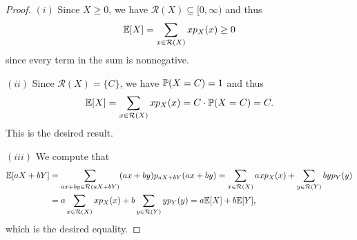 \begin{proof}
  $(i)$ Since $X \ge 0$, we have $\mathcal{R}(X) \subseteq [0, \infty)$
  and thus
  \[
    \mathbb{E}[X] = \sum_{x \in \mathcal{R}(X)} x p_X(x) \ge 0
  \]
  since every term in the sum is nonnegative.

  $(ii)$ Since $\mathcal{R}(X) = \{C\}$, we have
  $\mathbb{P}(X = C) = 1$ and thus
  \[
    \mathbb{E}[X] = \sum_{x \in \mathcal{R}(X)} x p_X(x)
    = C \cdot \mathbb{P}(X = C) = C.
  \]
  This is the desired result.

  $(iii)$ We compute that
  \begin{align*}
    \mathbb{E}[aX + bY]
    &= \sum_{ax + by \in \mathcal{R}(aX + bY)} (ax + by) p_{aX + bY}(ax + by)
    = \sum_{x \in \mathcal{R}(X)} ax p_{X}(x)
    + \sum_{y \in \mathcal{R}(Y)} by p_{Y}(y) \\
    &= a \sum_{x \in \mathcal{R}(X)} x p_{X}(x)
    + b \sum_{y \in \mathcal{R}(Y)} y p_{Y}(y)
    = a\mathbb{E}[X] + b\mathbb{E}[Y],
  \end{align*}
  which is the desired equality.
\end{proof}


